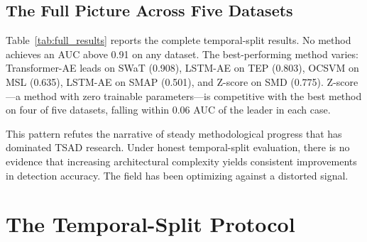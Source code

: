 \documentclass[preprint,12pt]{elsarticle}
\begin{document}
\subsection{The Full Picture Across Five Datasets}

Table~\ref{tab:full_results} reports the complete temporal-split results. No method achieves an AUC above 0.91 on any dataset. The best-performing method varies: Transformer-AE leads on SWaT (0.908), LSTM-AE on TEP (0.803), OCSVM on MSL (0.635), LSTM-AE on SMAP (0.501), and Z-score on SMD (0.775). Z-score---a method with zero trainable parameters---is competitive with the best method on four of five datasets, falling within 0.06 AUC of the leader in each case.

This pattern refutes the narrative of steady methodological progress that has dominated TSAD research. Under honest temporal-split evaluation, there is no evidence that increasing architectural complexity yields consistent improvements in detection accuracy. The field has been optimizing against a distorted signal.

\begin{table}[htbp]
\centering
\small\setlength{\tabcolsep}{3pt}
\caption{Temporal-split AUC-ROC across all datasets and methods (mean $\pm$ std of 3 seeds). Best method per dataset in \textbf{bold}.}
\label{tab:full_results}
\end{table}

\section{The Temporal-Split Protocol}
\end{document}

